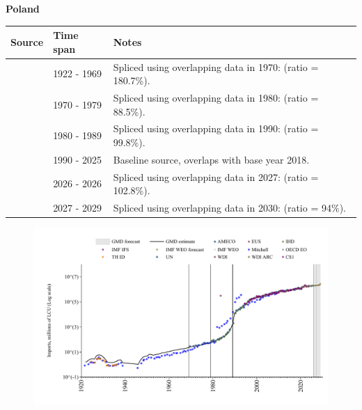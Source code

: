 \documentclass[12pt,a4paper,landscape]{article}
\begin{document}
\begin{adjustbox}{max totalsize={\paperwidth}{\paperheight},center}
\begin{minipage}[t][\textheight][t]{\textwidth}
\vspace*{0.5cm}
{}
\begin{center}
{\Large\bfseries Poland}
\end{center}
\vspace{0.5cm}
\begin{table}[H]
\centering
\small
\begin{tabular}{|l|l|l|}
\hline
\textbf{Source} & \textbf{Time span} & \textbf{Notes} \\
\hline
\rowcolor{white}\cite{Mitchell}& 1922 - 1969 &Spliced using overlapping data in 1970: (ratio = 180.7\%).\\
\rowcolor{lightgray}\cite{UN}& 1970 - 1979 &Spliced using overlapping data in 1980: (ratio = 88.5\%).\\
\rowcolor{white}\cite{AMECO}& 1980 - 1989 &Spliced using overlapping data in 1990: (ratio = 99.8\%).\\
\rowcolor{lightgray}\cite{OECD_EO}& 1990 - 2025 &Baseline source, overlaps with base year 2018.\\
\rowcolor{white}\cite{AMECO}& 2026 - 2026 &Spliced using overlapping data in 2027: (ratio = 102.8\%).\\
\rowcolor{lightgray}\cite{IMF_WEO_forecast}& 2027 - 2029 &Spliced using overlapping data in 2030: (ratio = 94\%).\\
\hline
\end{tabular}
\end{table}
\begin{figure}[H]
\centering
\includegraphics[width=\textwidth,height=0.6\textheight,keepaspectratio]{graphs/POL_imports.pdf}
\end{figure}
\end{minipage}
\end{adjustbox}
\end{document}
